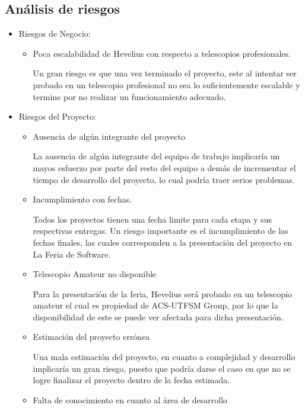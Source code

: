 \documentclass[letterpaper,spanish,10pt]{article}
\begin{document}
\subsection{An\'alisis de riesgos}
\begin{itemize}
\item{Riesgos de Negocio:} 
\begin{itemize}
\item{Poca escalabilidad de Hevelius con respecto a telescopios profesionales.}

Un gran riesgo es que una vez terminado el proyecto, este al intentar ser probado en un telescopio profesional no sea lo suficientemente escalable y termine por no realizar un funcionamiento adecuado.
\end{itemize}

\item{Riesgos del Proyecto:}
\begin{itemize}
\item{Ausencia de alg\'un integrante del proyecto}

La ausencia de alg\'un integrante del equipo de trabajo implicar\'ia un  mayos esfuerzo por parte del resto del equipo a dem\'as de incrementar el tiempo de desarrollo del proyecto, lo cual podr\'ia traer serios problemas.

\item{Incumplimiento con fechas.}

Todos los proyectos tienen una fecha limite para cada etapa y sus respectivas entregas. Un riesgo importante es el incumplimiento de las fechas finales, las cuales corresponden a la presentaci\'on del proyecto en La Feria de Software.	

\item{Telescopio Amateur no disponible}

Para la presentaci\'on de la feria, Hevelius ser\'a probado en un telescopio amateur el cual es propiedad de ACS-UTFSM Group, por lo que la disponibilidad de este se puede ver afectada para dicha presentaci\'on.

\item{Estimaci\'on del proyecto err\'onea}

Una mala estimaci\'on del proyecto, en cuanto a complejidad y desarrollo implicar\'ia un gran riesgo, puesto que podr\'ia darse el caso en que no se logre finalizar el proyecto dentro de la fecha estimada.

\item{Falta de conocimiento en cuanto al \'area de desarrollo}


\end{itemize}
\end{itemize}
\end{document}
